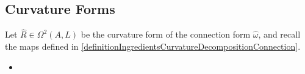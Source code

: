 \subsection{Curvature Forms}

Let $\hat R \in \Omega^2(A, L)$ be the curvature form of the connection form $\hat \omega$, and recall the maps defined in \ref{definitionIngredientsCurvatureDecompositionConnection}.

\begin{definition}
    \begin{itemize}
        
    \item 
        
    \end{itemize}
\end{definition}

\begin{proposition}

\end{proposition}



